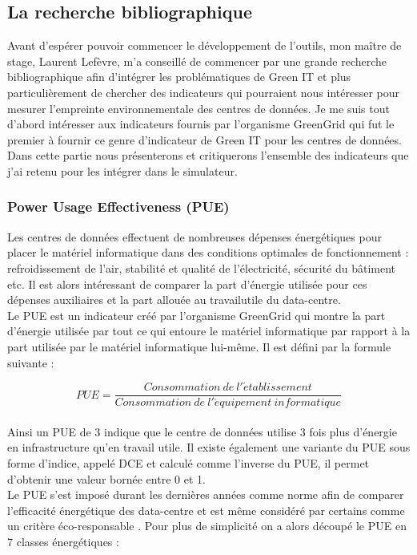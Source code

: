 \subsection{La recherche bibliographique}
Avant d'espérer pouvoir commencer le développement de l'outils, mon maître de stage, Laurent Lefèvre, m'a conseillé de commencer par une grande recherche bibliographique afin d'intégrer les problématiques de Green IT et plus particulièrement de chercher des indicateurs qui pourraient nous intéresser pour mesurer l'empreinte environnementale des centres de données. Je me suis tout d'abord intéresser aux indicateurs fournis par l'organisme GreenGrid qui fut le premier à fournir ce genre d'indicateur de Green IT pour les centres de données.\\

Dans cette partie nous présenterons et critiquerons l'ensemble des indicateurs que j'ai retenu pour les intégrer dans le simulateur.

\subsubsection{Power Usage Effectiveness (PUE)}
Les centres de données effectuent de nombreuses dépenses énergétiques pour placer le matériel informatique dans des conditions optimales de fonctionnement : refroidissement de l'air, stabilité et qualité de l'électricité, sécurité du bâtiment etc. Il est alors intéressant de comparer la part d'énergie utilisée pour ces dépenses auxiliaires et la part allouée au \gls{travailutile} du data-centre.\\

Le PUE est un indicateur créé par l'organisme GreenGrid qui montre la part d'énergie utilisée par tout ce qui entoure le matériel informatique par rapport à la part utilisée par le matériel informatique lui-même. Il est défini par la formule suivante :

\[PUE=\frac{Consommation\ de\ l'\acute{e}tablissement}{Consommation\ de\ l'\acute{e}quipement\ informatique}\]\\
Ainsi un PUE de 3 indique que le centre de données utilise 3 fois plus d'énergie en infrastructure qu'en travail utile. Il existe également une variante du PUE sous forme d'indice, appelé DCE et calculé comme l'inverse du PUE, il permet d'obtenir une valeur bornée entre 0 et 1.\\

Le PUE s'est imposé durant les dernières années comme norme afin de comparer l'efficacité énergétique des data-centre et est même considéré par certains comme un critère \og éco-responsable \fg{}. Pour plus de simplicité on a alors découpé le PUE en 7 classes énergétiques :

